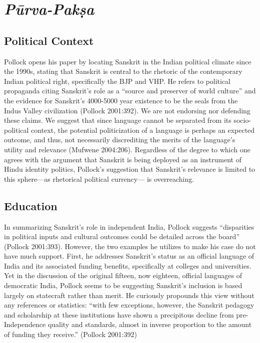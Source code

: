 \section*{{\sl Pūrva-Pakṣa}}

\subsection*{Political Context}

Pollock opens his paper by locating Sanskrit in the Indian political climate since the 1990s, stating that Sanskrit is central to the rhetoric of the contemporary Indian political right, specifically the BJP and VHP. He refers to political propaganda citing Sanskrit’s role as a “source and preserver of world culture” and the evidence for Sanskrit’s 4000-5000 year existence to be the seals from the Indus Valley civilization (Pollock 2001:392). We are not endorsing nor defending these claims. We suggest that since language cannot be separated from its socio-political context, the potential politicization of a language is perhaps an expected outcome, and thus, not necessarily discrediting the merits of the language’s utility and relevance (Mufwene 2004:206). Regardless of the degree to which one agrees with the argument that Sanskrit is being deployed as an instrument of Hindu identity politics, Pollock’s suggestion that Sanskrit’s relevance is limited to this sphere—as rhetorical political currency— is overreaching.
\vskip -20pt

\subsection*{Education}
\vskip -4pt

In summarizing Sanskrit’s role in independent India, Pollock suggests “disparities in political inputs and cultural outcomes could be detailed across the board” (Pollock 2001:393). However, the two examples he utilizes to make his case do not have much support. First, he addresses Sanskrit’s status as an official language of India and its associated funding benefits, specifically at colleges and universities. Yet in the discussion of the original fifteen, now eighteen, official languages of democratic India, Pollock seems to be suggesting Sanskrit’s inclusion is based largely on statecraft rather than merit. He curiously propounds this view  without any references or statistics: “with few exceptions, however, the Sanskrit pedagogy and scholarship at these institutions have shown a precipitous decline from pre-Independence quality and standards, almost in inverse proportion to the amount of funding they receive.” (Pollock 2001:392) 

